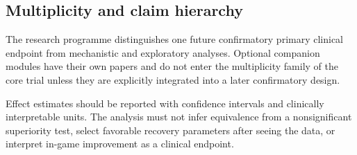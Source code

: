 \subsection{Multiplicity and claim hierarchy}

The research programme distinguishes one future confirmatory primary clinical endpoint from mechanistic and exploratory analyses. Optional companion modules have their own papers and do not enter the multiplicity family of the core trial unless they are explicitly integrated into a later confirmatory design.

Effect estimates should be reported with confidence intervals and clinically interpretable units. The analysis must not infer equivalence from a nonsignificant superiority test, select favorable recovery parameters after seeing the data, or interpret in-game improvement as a clinical endpoint.
